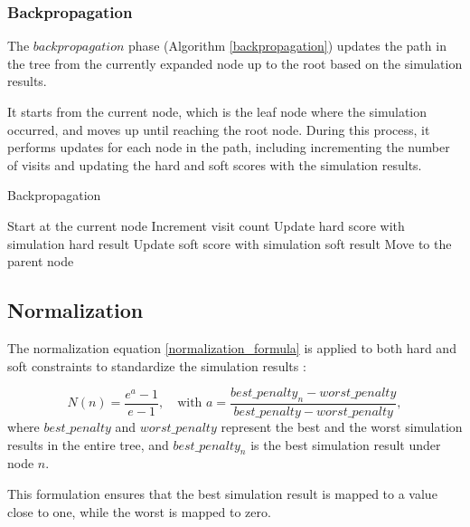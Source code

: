 \subsubsection{Backpropagation}

The \(backpropagation\) phase (Algorithm \ref{backpropagation}) updates the path in the tree from the currently expanded node up to the root based on the simulation results. 

It starts from the current node, which is the leaf node where the simulation occurred, and moves up until reaching the root node. During this process, it performs updates for each node in the path, including incrementing the number of visits and updating the hard and soft scores with the simulation results. 

\begin{algorithm}
\caption{Backpropagation}\label{backpropagation}
\begin{algorithmic}[1]
    \State Start at the current node
        \State Increment visit count
        \State Update hard score with simulation hard result
        \State Update soft score with simulation soft result
        \State Move to the parent node
    \EndWhile
\EndProcedure
\end{algorithmic}
\end{algorithm}

\subsection{Normalization}\label{sec:normalization}

The normalization equation \ref{normalization_formula} is applied to both hard and soft constraints to standardize the simulation results \cite{pedroso_tree_2015}:

\begin{equation}
N(n) = \frac{e^a - 1}{e - 1}, \quad \text{with } a = \frac{best\_penalty_n - worst\_penalty}{best\_penalty - worst\_penalty},\label{normalization_formula}
\end{equation}
where \(best\_penalty\) and \(worst\_penalty\) represent the best and the worst simulation results in the entire tree, and \(best\_penalty_n\) is the best simulation result under node \(n\).

This formulation ensures that the best simulation result is mapped to a value close to one, while the worst is mapped to zero.

